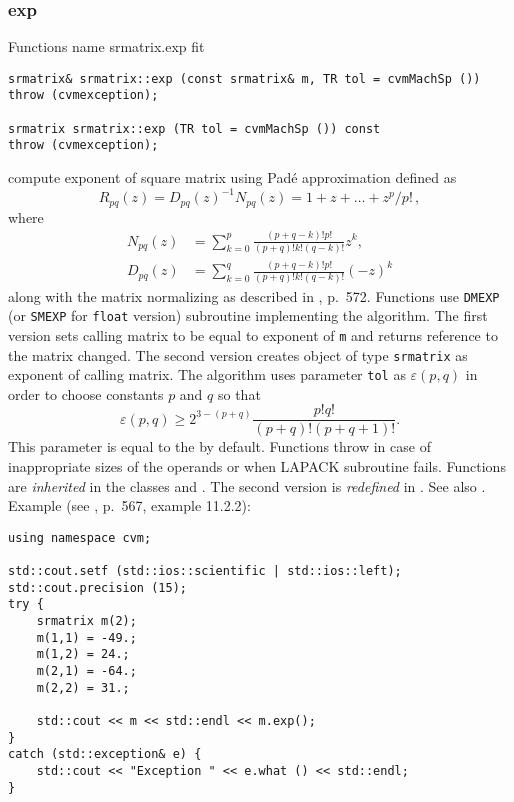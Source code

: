 \subsubsection{exp}
Functions%
\pdfdest name {srmatrix.exp} fit
\begin{verbatim}
srmatrix& srmatrix::exp (const srmatrix& m, TR tol = cvmMachSp ())
throw (cvmexception);

srmatrix srmatrix::exp (TR tol = cvmMachSp ()) const
throw (cvmexception);
\end{verbatim}
compute exponent of square matrix using Pad\'e approximation
defined as
\begin{equation*}
R_{pq}(z)=D_{pq}(z)^{-1}N_{pq}(z)=1+z+\dots+z^p/p!\,,
\end{equation*}
where
\begin{align*}
N_{pq}(z)&=\sum_{k=0}^p\frac{(p+q-k)!p!}{(p+q)!k!(q-k)!}z^k,\\
D_{pq}(z)&=\sum_{k=0}^q\frac{(p+q-k)!p!}{(p+q)!k!(q-k)!}(-z)^k
\end{align*}
along with the matrix normalizing as described in
, p.~572.
Functions use \verb"DMEXP" (or \verb"SMEXP" for \verb"float" version)
\FORTRAN subroutine implementing the algorithm.
The first version sets calling matrix to be equal to
exponent of \verb"m" and returns  reference to the matrix
changed. The second version
creates  object of type \verb"srmatrix" as 
exponent of  calling matrix.
The algorithm uses parameter \verb"tol"
as $\varepsilon(p,q)$ in order to choose constants $p$ and $q$
so that
\begin{equation*}
\varepsilon(p,q)\ge 2^{3-(p+q)}\frac{p!q!}{(p+q)!(p+q+1)!}.
\end{equation*}
This parameter is equal to the
 by default.
Functions throw   
in case of
inappropriate sizes of the operands or when LAPACK subroutine fails.
Functions are \emph{inherited} in the classes
and . The second version
is \emph{redefined} in .
See also
.
Example (see , p.~567,
example 11.2.2):
\begin{Verbatim}
using namespace cvm;

std::cout.setf (std::ios::scientific | std::ios::left); 
std::cout.precision (15);
try {
    srmatrix m(2);
    m(1,1) = -49.;
    m(1,2) = 24.;
    m(2,1) = -64.;
    m(2,2) = 31.;

    std::cout << m << std::endl << m.exp();
}
catch (std::exception& e) {
    std::cout << "Exception " << e.what () << std::endl;
}
\end{Verbatim}
